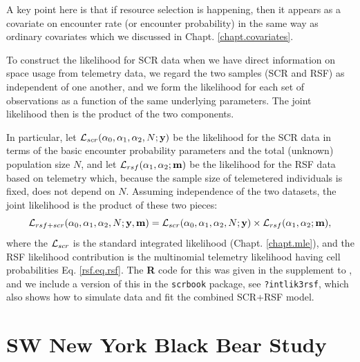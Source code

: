 A key point here is that if resource selection is happening, then it
appears as a covariate on encounter rate (or encounter
probability) in the same way as ordinary covariates which we discussed in
Chapt. \ref{chapt.covariates}.


To construct the likelihood for SCR data when we have 
direct information on space usage
from telemetry data, we regard the two samples (SCR and RSF) as
independent of one another, and we 
 form the likelihood for each set of observations as a function
of the same underlying parameters. The joint likelihood then is the
product of the two components. 

In particular, let ${\cal L}_{scr}(\alpha_{0}, \alpha_{1}, \alpha_{2}, N;{\bf y})$
be the likelihood for the SCR data in terms of the basic encounter
probability parameters and the total (unknown) population size $N$,
and let ${\cal L}_{rsf}(\alpha_{1},\alpha_{2}; {\bf m})$ be the
likelihood for the RSF data based on telemetry which, because the
sample size of telemetered individuals is fixed, does not depend on $N$.
Assuming independence of the two datasets, the
joint likelihood is the product of these two pieces:
\[
{\cal L}_{rsf+scr}(\alpha_{0},\alpha_{1},\alpha_{2},N; {\bf y},{\bf
  m})  =
{\cal L}_{scr}(\alpha_{0}, \alpha_{1}, \alpha_{2}, N;{\bf y})
\times
{\cal L}_{rsf}(\alpha_{1},\alpha_{2}; {\bf m}),
\]
where the ${\cal L}_{scr}$ is the standard integrated likelihood
(Chapt. \ref{chapt.mle}), and the RSF likelihood contribution is the
multinomial telemetry likelihood having cell probabilities
Eq. \ref{rsf.eq.rsf}.  The {\bf R} code for this 
was given in the
supplement to \citet{royle_etal:2012mee}, and we include a version of
this in the \mbox{\tt scrbook} package, see \mbox{\tt ?intlik3rsf},
which also shows how to simulate data and fit the combined SCR+RSF
model.


\section{SW  New York Black Bear Study}
\label{rsf.chapt.nybears}

